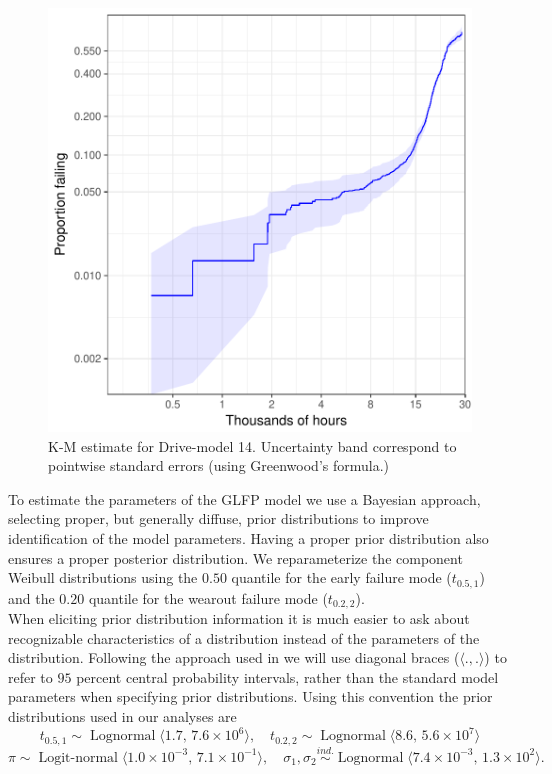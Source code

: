 \documentclass[12pt]{article}
\newcommand{\op}{\operatorname}
\begin{document}
\begin{figure}[H]
\centering
  \includegraphics[width=.6\textwidth]{km14-prob}
  \caption{K-M estimate for Drive-model 14.  Uncertainty band correspond to pointwise standard errors (using Greenwood's formula.)}
  \label{fig1}
\end{figure}


To estimate the parameters of the GLFP model we use a Bayesian approach, selecting proper, but generally diffuse, prior distributions to improve identification of the model parameters. Having a proper prior distribution also ensures a proper posterior distribution. We reparameterize the component Weibull distributions using the $0.50$ quantile for the early failure mode ($t_{0.5,1}$) and the $0.20$ quantile for the wearout failure mode ($t_{0.2,2}$). \\

When eliciting prior distribution information it is much easier to ask about recognizable characteristics of a distribution instead of the parameters of the distribution.  Following the approach used in \cite[Section 15.2.2]{intervals} we will use diagonal braces ($\langle.,.\rangle$) to refer to $95$ percent central probability intervals, rather than the standard model parameters when specifying prior distributions.  Using this convention the prior distributions used in our analyses are
$$t_{0.5,1} \sim \op{Lognormal} \langle 1.7,\,7.6\times 10^6 \rangle,\quad
t_{0.2,2} \sim \op{Lognormal}\langle 8.6, \, 5.6\times 10^7 \rangle$$
$$\pi \sim \op{Logit-normal}\langle 1.0\times 10^{-3},\, 7.1\times 10^{-1} \rangle,\quad
\sigma_1, \sigma_2 \stackrel{ind.}{\sim} \op{Lognormal}\langle 7.4 \times 10 ^{-3} ,\,1.3 \times 10^2 \rangle. $$
\end{document}
